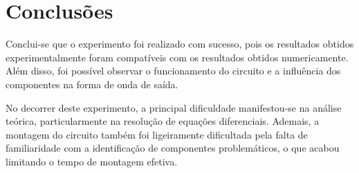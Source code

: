 \section{Conclusões}

Conclui-se que o experimento foi realizado com sucesso, pois os resultados obtidos experimentalmente foram compatíveis com os resultados obtidos numericamente. Além disso, foi possível observar o funcionamento do circuito e a influência dos componentes na forma de onda de saída.

No decorrer deste experimento, a principal dificuldade manifestou-se na análise teórica, particularmente na resolução de equações diferenciais. Ademais, a montagem do circuito também foi ligeiramente dificultada pela falta de familiaridade com a identificação de componentes problemáticos, o que acabou limitando o tempo de montagem efetiva.